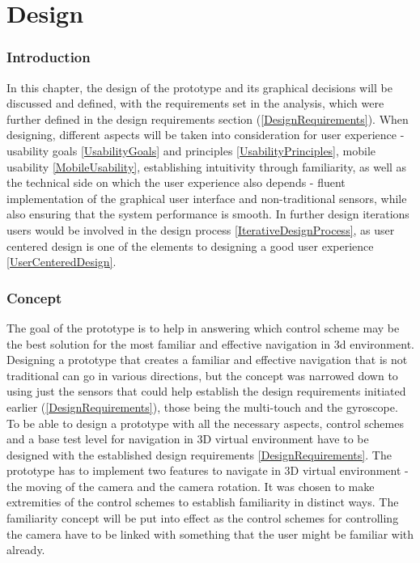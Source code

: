 \chapter{Design}
\subsection{Introduction}
In this chapter, the design of the prototype and its graphical decisions will be discussed and defined, with the requirements set in the analysis, which were further defined in the design requirements section (\ref{DesignRequirements}). When designing, different aspects will be taken into consideration for user experience - usability goals \ref{UsabilityGoals} and principles \ref{UsabilityPrinciples}, mobile usability \ref{MobileUsability}, establishing intuitivity through familiarity, as well as the technical side on which the user experience also depends - fluent implementation of the graphical user interface and non-traditional sensors, while also ensuring that the system performance is smooth. In further design iterations users would be involved in the design process \ref{IterativeDesignProcess}, as user centered design is one of the elements to designing a good user experience \ref{UserCenteredDesign}.

\subsection{Concept}
The goal of the prototype is to help in answering which control scheme may be the best solution for the most familiar and effective navigation in 3d environment. Designing a prototype that creates a familiar and effective navigation that is not traditional can go in various directions, but the concept was narrowed down to using just the sensors that could help establish the design requirements initiated earlier (\ref{DesignRequirements}), those being the multi-touch and the gyroscope.
To be able to design a prototype with all the necessary aspects, control schemes and a base test level for navigation in 3D virtual environment have to be designed with the established design requirements \ref{DesignRequirements}.
The prototype has to implement two features to navigate in 3D virtual environment - the moving of the camera and the camera rotation. It was chosen to make extremities of the control schemes to establish familiarity in distinct ways. The familiarity concept will be put into effect as the control schemes for controlling the camera have to be linked with something that the user might be familiar with already. 

